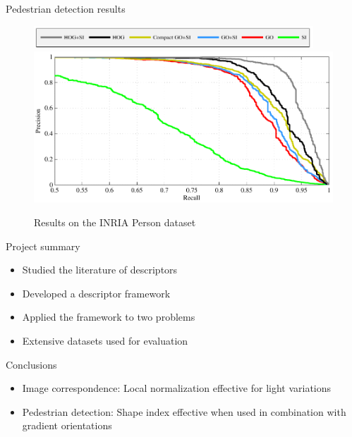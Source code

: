 \documentclass[14pt,t]{beamer}
\begin{document}
\begin{frame}{Pedestrian detection results}
\begin{figure}[tb]
\centering
	\hspace{0.54cm}\includegraphics[width=0.935\textwidth]{../report/img/inriaTestResultsLegend.pdf} \\
	\includegraphics[width=\textwidth]{../report/img/inriaTestResultsPR.pdf}
	\caption{Results on the INRIA Person dataset}
	\label{fig:inriaTestResults}
\end{figure}
\end{frame}
%
\begin{frame}[c]{Project summary}
\begin{itemize}
	\item Studied the literature of descriptors
	\vspace{0.8cm}
	\item Developed a descriptor framework
	\vspace{0.8cm}
	\item Applied the framework to two problems
	\vspace{0.8cm}
	\item Extensive datasets used for evaluation
\end{itemize}
\end{frame}
%
\begin{frame}[c]{Conclusions}
\begin{itemize}
\item Image correspondence: Local normalization effective for light variations
\vspace{1cm}
\item Pedestrian detection: Shape index effective when used in combination with gradient orientations
\end{itemize}
\end{frame}
\end{document}
